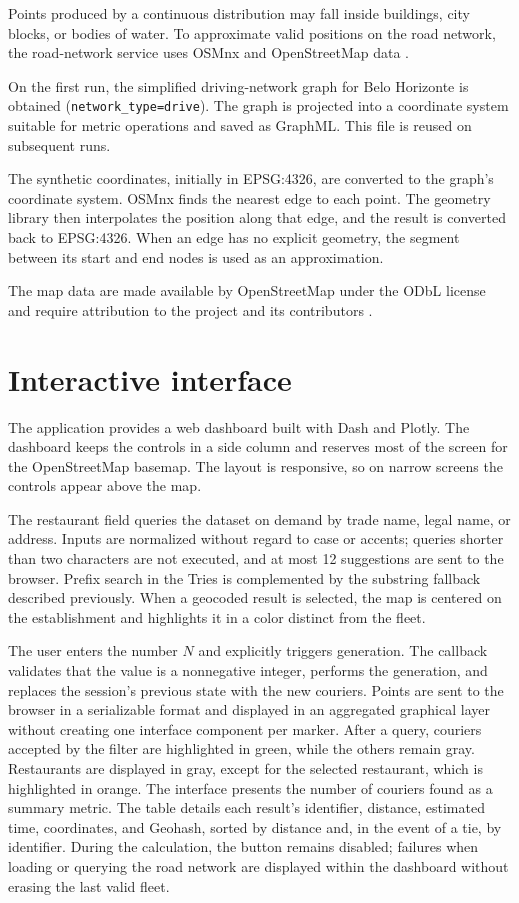 \documentclass[12pt,a4paper]{article}
\begin{document}
Points produced by a continuous distribution may fall inside buildings, city
blocks, or bodies of water. To approximate valid positions on the road network,
the road-network service uses OSMnx and OpenStreetMap data
\cite{osmnx-docs,osm-copyright}.

On the first run, the simplified driving-network graph for Belo Horizonte is
obtained (\texttt{network\_type=drive}). The graph is projected into a
coordinate system suitable for metric operations and saved as GraphML. This
file is reused on subsequent runs.

The synthetic coordinates, initially in EPSG:4326, are converted to the graph's
coordinate system. OSMnx finds the nearest edge to each point. The geometry
library then interpolates the position along that edge, and the result is
converted back to EPSG:4326. When an edge has no explicit geometry, the segment
between its start and end nodes is used as an approximation.

The map data are made available by OpenStreetMap under the ODbL license and require
attribution to the project and its contributors
\cite{osm-copyright}.

\section{Interactive interface}

The application provides a web dashboard built with Dash and Plotly. The
dashboard keeps the controls in a side column and reserves most of the screen
for the OpenStreetMap basemap. The layout is responsive, so on narrow screens
the controls appear above the map.

The restaurant field queries the dataset on demand by trade name, legal name,
or address. Inputs are normalized without regard to case or accents; queries
shorter than two characters are not executed, and at most 12 suggestions are
sent to the browser. Prefix search in the Tries is complemented by the
substring fallback described previously. When a geocoded result is selected,
the map is centered on the establishment and highlights it in a color distinct
from the fleet.

The user enters the number $N$ and explicitly triggers generation. The
callback validates that the value is a nonnegative integer, performs the
generation, and replaces the session's previous state with the new couriers.
Points are sent to the browser in a serializable format and displayed in an
aggregated graphical layer without creating one interface component per marker.
After a query, couriers accepted by the filter are highlighted in green, while
the others remain gray. Restaurants are displayed in gray, except for the
selected restaurant, which is highlighted in orange. The interface presents
the number of couriers found as a summary metric. The table details each
result's identifier, distance, estimated time, coordinates, and Geohash, sorted
by distance and, in the event of a tie, by identifier. During the calculation,
the button remains disabled; failures when loading or querying the road network
are displayed within the dashboard without erasing the last valid fleet.
\end{document}
